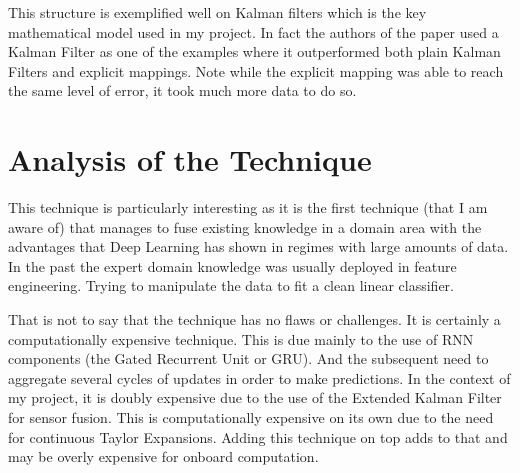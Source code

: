 \documentclass[]{article}
\begin{document}
This structure is exemplified well on Kalman filters which is the key mathematical model used in my project. In fact the authors of the paper used a Kalman Filter as one of the examples where it outperformed both plain Kalman Filters and explicit mappings. Note while the explicit mapping was able to reach the same level of error, it took much more data to do so.


\section{Analysis of the Technique}

This technique is particularly interesting as it is the first technique (that I am aware of) that manages to fuse existing knowledge in a domain area with the advantages that Deep Learning has shown in regimes with large amounts of data.
In the past the expert domain knowledge was usually deployed in feature engineering. Trying to manipulate the data to fit a clean linear classifier.

That is not to say that the technique has no flaws or challenges. It is certainly a computationally expensive technique. This is due mainly to the use of RNN components (the Gated Recurrent Unit or GRU). And the subsequent need to aggregate several cycles of updates in order to make predictions.
In the context of my project, it is doubly expensive due to the use of the Extended Kalman Filter for sensor fusion. This is computationally expensive on its own due to the need for continuous Taylor Expansions. Adding this technique on top adds to that and may be overly expensive for onboard computation.




\end{document}
